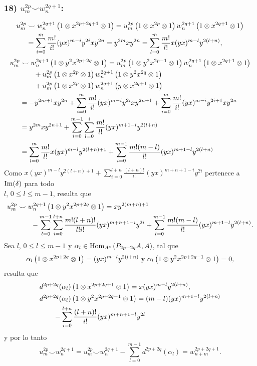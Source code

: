 \documentclass[fleqn,../tesis.tex]{subfiles}
\begin{document}
\subsubsection{18) $u_m^{2p} \smile w_n^{2q + 1}$:}
\begin{align*}
	u_m^{2p} & \smile w_n^{2q + 1}\left(1\otimes x^{2p + 2q + 1} \otimes 1\right)
		= u_m^{2p}\left(1\otimes x^{2p}\otimes 1\right)w_n^{2q + 1}\left(1\otimes x^{2q + 1}\otimes 1\right)\\
	&= \sum_{i = 0}^{m}\frac{m!}{i!}(yx)^{m - i}y^{2i}xy^{2n} = y^{2m}xy^{2n}
		= \sum_{l = 0}^{m}\frac{m!}{l!}x(yx)^{m - l}y^{2(l + n)},
\end{align*}
\begin{align*}
	u_m^{2p} & \smile w_n^{2q + 1}\left(1\otimes y^2x^{2p + 2q} \otimes 1\right)
		= u_m^{2p}\left(1\otimes y^2x^{2p - 1}\otimes 1\right)w_n^{2q + 1}\left(1\otimes x^{2q + 1}\otimes 1\right)\\
	&\qquad + u_m^{2p}\left(1 \otimes x^{2p} \otimes 1\right)w_n^{2q + 1}\left(1\otimes y^2x^{2q}\otimes 1\right)\\
	&\qquad + u_m^{2p}\left(1 \otimes x^{2p} \otimes 1\right)w_n^{2q + 1}\left(y\otimes x^{2q +1}\otimes 1\right)\\
	&= -y^{2m + 1}xy^{2n} + \sum_{i = 0}^{m}\frac{m!}{i!}(yx)^{m - i}y^{2i}xy^{2n + 1}
		+ \sum_{i = 0}^{m}\frac{m!}{i!}(yx)^{m - i}y^{2i + 1}xy^{2n}\\
	&= y^{2m}xy^{2n + 1}
		+ \sum_{i = 0}^{m - 1}\sum_{l =0}^{i}\frac{m!}{l!}(yx)^{m + 1 - l}y^{2(l + n)}\\
	&= \sum_{l = 0}^{m}\frac{m!}{l!}x(yx)^{m - l}y^{2(l + n) + 1}
		+ \sum_{i = 0}^{m - 1}\frac{m!(m - l)}{l!}(yx)^{m + 1 - l}y^{2(l + n)}\\
\end{align*}
Como $x(yx)^{m - l}y^{2(l + n) + 1}
	+ \sum_{i = 0}^{l + n}\frac{(l + n)!}{i!}(yx)^{m + n + 1 -i}y^{2i}$ pertenece a $\operatorname{Im}(\delta)$
	para todo \\ $l$, $0 \leq l \leq m - 1$, resulta que
\begin{align*}
	u_m^{2p} & \smile w_n^{2q + 1}\left(1\otimes y^2x^{2p + 2q} \otimes 1\right) = xy^{2(m + n) + 1}\\
		&\qquad - \sum_{l = 0}^{m - 1}\sum_{i = 0}^{l + n}\frac{m!(l + n)!}{l!i!}(yx)^{m + n + 1 -i}y^{2i}
		+\sum_{l = 0}^{m - 1}\frac{m!(m - l)}{l!}(yx)^{m + 1 - l}y^{2(l + n)}.
\end{align*}
Sea $l$, $0\leq l \leq m - 1$ y $\alpha_l \in \operatorname{Hom}_{A^{e}}\left(P_{2p + 2q}A, A\right)$, tal que
\[
	\alpha_l\left(1 \otimes x^{2p + 2q} \otimes 1\right) = (yx)^{m -l}y^{2(l + n)} \text{ y }
		\alpha_l\left(1 \otimes y^2x^{2p + 2q - 1} \otimes 1\right) = 0,
\]
resulta que
\begin{align*}
	&d^{2p + 2q}(\alpha_l)\left(1 \otimes x^{2p + 2q + 1} \otimes 1\right) = x(yx)^{m - l}y^{2(l + n)},\\
	&d^{2p + 2q}(\alpha_l)\left(1 \otimes y^2x^{2p + 2q - 1} \otimes 1\right)
		=(m - l)(yx)^{m  + 1 - l}y^{2(l + n)}\\
	&\qquad- \sum_{i = 0}^{l + n}\frac{(l + n)!}{i!}(yx)^{m + n  +1 -l}y^{2l}
\end{align*}
y por lo tanto
\[
	u_m^{2p}  \smile w_n^{2q + 1} = u_m^{2p}  \smile w_n^{2q + 1}
		- \sum_{l = 0}^{m - 1}d^{2p + 2q}(\alpha_l) = w_{n + m}^{2p + 2q + 1}.
\]
\end{document}
